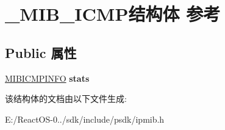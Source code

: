 \hypertarget{struct___m_i_b___i_c_m_p}{}\section{\+\_\+\+M\+I\+B\+\_\+\+I\+C\+M\+P结构体 参考}
\label{struct___m_i_b___i_c_m_p}
\subsection*{Public 属性}
\begin{DoxyCompactItemize}
\item 
\mbox{\label{struct___m_i_b___i_c_m_p_afb174bf42993086d9c0471c5a69f08fa}} 
\hyperlink{struct___m_i_b_i_c_m_p_i_n_f_o}{M\+I\+B\+I\+C\+M\+P\+I\+N\+FO} {\bfseries stats}
\end{DoxyCompactItemize}


该结构体的文档由以下文件生成\+:\begin{DoxyCompactItemize}
\item 
E\+:/\+React\+O\+S-\/0../sdk/include/psdk/ipmib.\+h\end{DoxyCompactItemize}
